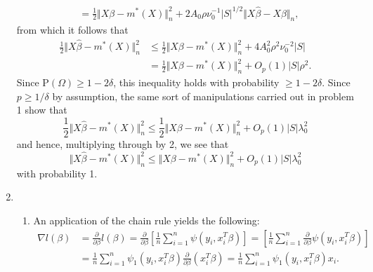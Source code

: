 \documentclass[12pt]{article}
\newcommand{\Prob}{\mathrm{P}}
\begin{document}
\begin{enumerate}
\begin{align*}
&= \frac{1}{2}\Vert X\beta - m^*(X) \Vert_n^2 + 2A_0 \rho \nu_0^{-1} |S|^{1/2} \Vert X\hat{\beta} - X\beta \Vert_n,
\end{align*}
from which it follows that
\begin{align*}
\frac{1}{2}\Vert X\hat{\beta} - m^*(X) \Vert_n^2 &\leq \frac{1}{2}\Vert X\beta - m^*(X) \Vert_n^2 + 4A_0^2 \rho^2 \nu_0^{-2} |S| \\
&= \frac{1}{2}\Vert X\beta - m^*(X) \Vert_n^2 + O_p(1) |S| \rho^2.
\end{align*}
Since $\Prob(\Omega) \geq 1 - 2\delta$, this inequality holds with probability $\geq 1 - 2\delta$. Since $p \geq 1 / \delta$ by assumption, the same sort of manipulations carried out in problem 1 show that
\begin{equation*}
\frac{1}{2}\Vert X\hat{\beta} - m^*(X) \Vert_n^2 \leq \frac{1}{2}\Vert X\beta - m^*(X) \Vert_n^2 + O_p(1) |S| \lambda_0^2
\end{equation*}
and hence, multiplying through by 2, we see that
\begin{equation*}
\Vert X\hat{\beta} - m^*(X) \Vert_n^2 \leq \Vert X\beta - m^*(X) \Vert_n^2 + O_p(1) |S| \lambda_0^2
\end{equation*}
with probability 1.

\item
\begin{enumerate}[label=(\roman*)]
\item
An application of the chain rule yields the following:
\begin{align*}
\nabla l(\beta) &= \frac{\partial}{\partial \beta} l(\beta) = \frac{\partial}{\partial \beta} \left[\frac{1}{n} \sum_{i=1}^n \psi(y_i, x_i^T\beta) \right] = \left[\frac{1}{n} \sum_{i=1}^n \frac{\partial}{\partial \beta} \psi(y_i, x_i^T\beta) \right] \\
&= \frac{1}{n} \sum_{i=1}^n \psi_1(y_i, x_i^T\beta) \frac{\partial}{\partial \beta} (x_i^T\beta) = \frac{1}{n} \sum_{i=1}^n \psi_1(y_i, x_i^T\beta) x_i.
\end{align*}


\end{enumerate}
\end{enumerate}
\end{document}
